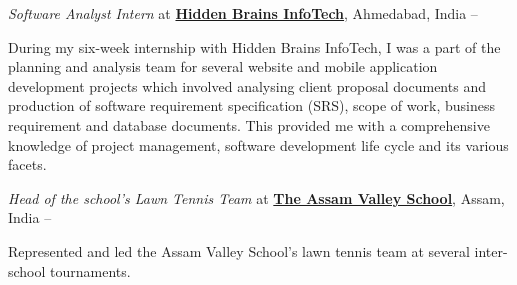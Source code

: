 \documentclass[a4paper,10pt,oneside]{article}
\begin{document}
\begin{body}
\BigEntryGapNoBreak
\textit{Software Analyst Intern} at
\href{http://www.hiddenbrains.com/}
{\textbf{Hidden Brains InfoTech}},
Ahmedabad, India
\hfill
{} --
\EntryGapNoBreak
\begin{detailwithoutsubheading}
\BulletItem
During my six-week internship with Hidden Brains InfoTech, I was a part of the planning and analysis team for several website and mobile application development projects which involved analysing client proposal documents and production of software requirement specification (SRS), scope of work, business requirement and database documents. This provided me with a comprehensive knowledge of project management, software development life cycle and its various facets.
\end{detailwithoutsubheading}

\BigEntryGapNoBreak
\textit{Head of the school's Lawn Tennis Team} at \href{http://www.assamvalleyschool.com}{\textbf{The Assam Valley School}},
Assam, India
\hfill
{} --
\begin{detailwithoutsubheading}
\BulletItem
Represented and led the Assam Valley School's lawn tennis team at several inter-school tournaments.
\end{detailwithoutsubheading}
\vspace{-5pt}
\hline


\end{body}
\end{document}

